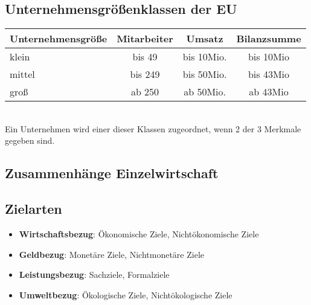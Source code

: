 \subsection{Unternehmensgrößenklassen der EU}
\begin{tabular}{|l|| c|c|c|}
  \hline
  Unternehmensgröße & Mitarbeiter & Umsatz & Bilanzsumme \\
  \hline
  klein & bis 49 & bis 10Mio. & bis 10Mio \\
  mittel & bis 249 & bis 50Mio. & bis 43Mio \\
  groß & ab 250 & ab 50Mio. & ab 43Mio \\
  \hline
\end{tabular}\\
Ein Unternehmen wird einer dieser Klassen zugeordnet, wenn 2 der 3 Merkmale gegeben sind.


\subsection{Zusammenhänge Einzelwirtschaft}


\subsection{Zielarten}
\begin{itemize}
  \item \textbf{Wirtschaftsbezug}: Ökonomische Ziele, Nichtökonomische Ziele
  \item \textbf{Geldbezug}: Monetäre Ziele, Nichtmonetäre Ziele
  \item \textbf{Leistungsbezug}: Sachziele, Formalziele
  \item \textbf{Umweltbezug}: Ökologische Ziele, Nichtökologische Ziele 
\end{itemize}
